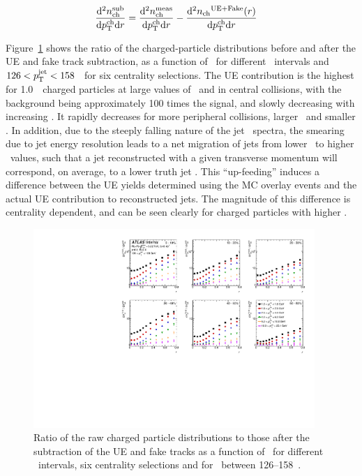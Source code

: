 \begin{align*}
\frac{\mathrm{d}^2 \mbox{$n_{\mathrm{ch}}^{\mathrm{sub}}$} }{ \mathrm{d} \mbox{$p_{\mathrm{T}}^{\mathrm{ch}}$} \mathrm{d} r } &=  \frac{\mathrm{d}^2 \mbox{$n_{\mathrm{ch}}^{\mathrm{meas}}$} }{ \mathrm{d} \mbox{$p_{\mathrm{T}}^{\mathrm{ch}}$} \mathrm{d} r} -  \frac{ \mathrm{d}^2 \mbox{$n_{\mathrm{ch}}$}^{\mathrm{UE+Fake}}(r)  }{ \mathrm{d} \mbox{$p_{\mathrm{T}}^{\mathrm{ch}}$} \mathrm{d} r} 
\end{align*}

Figure~\ref{fig:UEsize} shows the ratio of the charged-particle distributions before and after the UE and fake track subtraction,
 as a function of \rvar\ for different \pttrk\ intervals and $126 < \mbox{$p_{\mathrm{T}}^{\mathrm{jet}}$} < 158$ \GeV\ for six centrality selections. The UE contribution is the highest for 1.0~\GeV\ charged particles at large values of \rvar\ and in central collisions, with the background being approximately 100 times the signal, and slowly decreasing with increasing \ptjet. It rapidly decreases for more peripheral collisions, larger \pttrk\ and smaller \rvar. In addition, due to the steeply falling nature of the jet \pt\ spectra, the smearing due to jet energy resolution leads to a net migration of jets from lower \ptjet\ to higher \ptjet\ values, such that a jet reconstructed with a given transverse momentum will correspond, on average, to a lower truth jet \pT.  This ``up-feeding'' induces a difference between the UE yields determined using the MC overlay events and the actual UE contribution to reconstructed jets. The magnitude of this difference is centrality dependent, and can be seen clearly for charged particles with higher \pt.

\begin{figure}
\centerline{
 \includegraphics[width=0.95\textwidth]{figures/performance/UE_B2S_single_0.pdf} }
\caption{ Ratio of the raw charged particle distributions to those after the subtraction of the UE and fake tracks as a function of \rvar\ for different \pttrk\ intervals, six centrality selections and for \ptjet\ between 126--158~\GeV.}
\label{fig:UEsize}
\end{figure}


